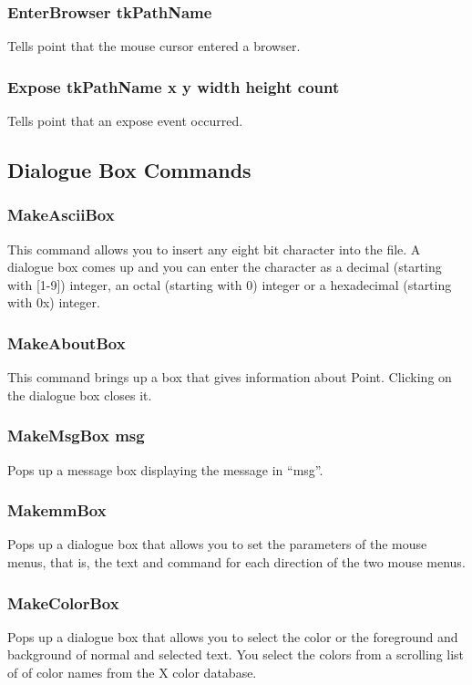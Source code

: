 \subsubsection{EnterBrowser tkPathName}
Tells point that the mouse cursor entered a browser.

\subsubsection{Expose tkPathName x y width height count}
Tells point that an expose event occurred.





\subsection{ Dialogue Box Commands }

\subsubsection{MakeAsciiBox}
This command allows you to insert any eight bit character into the file.
A dialogue box comes up and you can enter the character as a decimal
(starting with [1-9]) integer, an octal (starting with 0) integer or
a hexadecimal (starting with 0x) integer.

\subsubsection{MakeAboutBox}
This command brings up a box that gives information
about Point.
Clicking on the dialogue box closes it.

\subsubsection{MakeMsgBox msg}
Pops up a message box displaying the message in ``msg''.

\subsubsection{MakemmBox}
Pops up a dialogue box that allows you to set the parameters
of the mouse menus, that is, the text and command for each
direction of the two mouse menus.

\subsubsection{MakeColorBox}
Pops up a dialogue box that allows you to select the color
or the foreground and background of normal and selected text.
You select the colors from a scrolling list of of color names from
the X color database.

